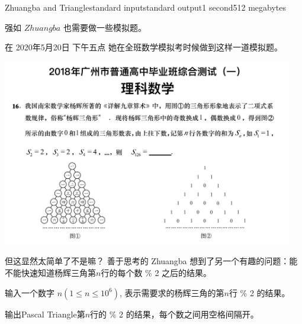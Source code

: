 \begin{problem}{Zhuangba and Triangle}{standard input}{standard output}{1 second}{512 megabytes}


强如 $Zhuangba$ 也需要做一些模拟题。

在 2020年5月20日 下午五点 她在全班数学模拟考时候做到这样一道模拟题。

\includegraphics[width=0.95\textwidth]{aa.png}%


但这显然太简单了不是嘛？ 善于思考的 Zhuangba 想到了另一个有趣的问题：能不能快速知道杨辉三角第$n$行的每个数 \% 2 之后的结果。

\InputFile

输入一个数字 $n(1\le n \le 10^6)$, 表示需要求的杨辉三角的第$n$行 \% 2 的结果。

\OutputFile

输出Pascal Triangle第$n$行的 \% 2 的结果，每个数之间用空格间隔开。

\Example

\begin{example}
%
%
\end{example}

\end{problem}
